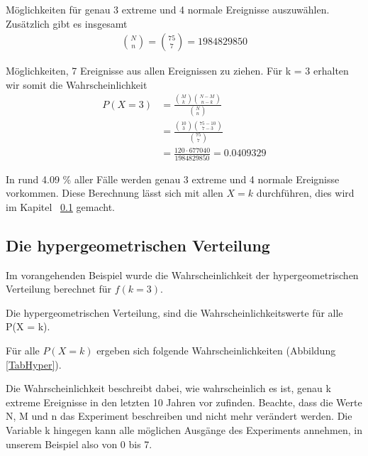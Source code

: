 \begin{refsection}
Möglichkeiten für genau 3 extreme und 4 normale Ereignisse auszuwählen.
Zusätzlich gibt es insgesamt
\begin{align*}
\binom{N}{n} = \binom{75}{7} = 1984829850
\end{align*}

Möglichkeiten, 7 Ereignisse aus allen Ereignissen zu ziehen.
Für k = 3 erhalten wir somit die Wahrscheinlichkeit
\begin{align*}
P(X = 3) &= \frac{\displaystyle \binom{M}{k} \binom{N-M}{n-k}}{\displaystyle \binom{N}{n} }  \\
&= \frac{\displaystyle \binom{10}{3} \binom{75-10}{7-3}}{\displaystyle \binom{75}{7} } \\
&= \frac{ 120 \cdot 677040}{ 1984829850 } = 0.0409329
\end{align*}

In rund 4.09 \% aller Fälle werden genau 3 extreme und 4 normale Ereignisse vorkommen. Diese Berechnung lässt sich mit allen $X=k$ durchführen, dies wird im Kapitel ~\ref{Dichtehyper}  gemacht.


\subsection{Die hypergeometrischen Verteilung} \label{Dichtehyper}
Im vorangehenden Beispiel wurde die Wahrscheinlichkeit der hypergeometrischen Verteilung berechnet für $f(k = 3)$. 

\begin{definition}
Die hypergeometrischen Verteilung, sind die Wahrscheinlichkeitswerte für alle P(X = k).
\end{definition}

Für alle $P (X=k)$ ergeben sich folgende Wahrscheinlichkeiten (Abbildung \ref{TabHyper}).


Die Wahrscheinlichkeit beschreibt dabei, wie wahrscheinlich es ist, genau k extreme Ereignisse in den letzten 10 Jahren vor zufinden.
Beachte, dass die Werte N, M und n das Experiment beschreiben und nicht mehr verändert werden. Die Variable k hingegen kann alle möglichen Ausgänge des Experiments annehmen, in unserem Beispiel also von 0 bis 7.



\end{refsection}
